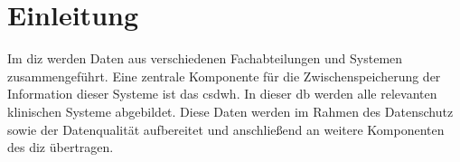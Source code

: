 \chapter{Einleitung}

Im \ac{diz} werden Daten aus verschiedenen Fachabteilungen und Systemen zusammengeführt. Eine zentrale Komponente für die Zwischenspeicherung der Information dieser Systeme ist das \acf{csdwh}. In dieser \ac{db} werden alle relevanten klinischen Systeme abgebildet. Diese Daten werden im Rahmen des Datenschutz sowie der Datenqualität aufbereitet und anschließend an weitere Komponenten des \ac{diz} übertragen.